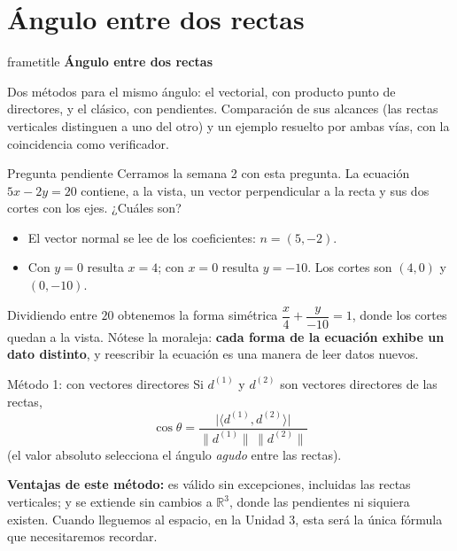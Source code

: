 \documentclass[aspectratio=169,10pt]{beamer}
\newcommand{\destaca}[1]{%
  \par\vspace{3pt}\noindent
  \colorbox{turquesaClaro}{%
    \parbox{\dimexpr\linewidth-2\fboxsep\relax}{\vspace{3pt}#1\vspace{3pt}}}%
  \par\vspace{3pt}}
\newcommand{\hojaSesion}[2]{%
  \vfill
  \begin{beamercolorbox}[wd=\textwidth,sep=16pt,center]{frametitle}
    {\Large\bfseries #1}\\[11pt]
    \begin{minipage}{0.82\textwidth}\centering\small #2\end{minipage}
  \end{beamercolorbox}
  \vfill}
\newcommand{\R}{\mathbb{R}}
\newcommand{\pp}[2]{\langle #1,#2\rangle}
\newcommand{\norma}[1]{\lVert #1\rVert}
\begin{document}
\section{Ángulo entre dos rectas}
\begin{frame}[plain]
  \hojaSesion{Ángulo entre dos rectas}{%
  Dos métodos para el mismo ángulo: el vectorial, con producto punto
  de directores, y el clásico, con pendientes. Comparación de sus
  alcances (las rectas verticales distinguen a uno del otro) y un
  ejemplo resuelto por ambas vías, con la coincidencia como
  verificador.}
\end{frame}
\begin{frame}{Pregunta pendiente}
  Cerramos la semana 2 con esta pregunta. La ecuación $5x-2y=20$
  contiene, a la vista, un vector perpendicular a la recta y sus dos
  cortes con los ejes. ¿Cuáles son?

  \vspace{0.3cm}
  \begin{itemize}
    \item El vector normal se lee de los coeficientes: $n=(5,-2)$.
    \item Con $y=0$ resulta $x=4$; con $x=0$ resulta $y=-10$.
      Los cortes son $(4,0)$ y $(0,-10)$.
  \end{itemize}

  \vspace{0.3cm}
  \destaca{Dividiendo entre $20$ obtenemos la forma simétrica
  $\dfrac{x}{4}+\dfrac{y}{-10}=1$, donde los cortes quedan a la vista.
  Nótese la moraleja: \textbf{cada forma de la ecuación exhibe un dato
  distinto}, y reescribir la ecuación es una manera de leer datos
  nuevos.}
\end{frame}
\begin{frame}{Método 1: con vectores directores}
  Si $d^{(1)}$ y $d^{(2)}$ son vectores directores de las rectas,
  \[
    \cos\theta=\frac{\bigl|\pp{d^{(1)}}{d^{(2)}}\bigr|}
      {\norma{d^{(1)}}\,\norma{d^{(2)}}}
  \]
  (el valor absoluto selecciona el ángulo \textit{agudo} entre las
  rectas).

  \vspace{0.4cm}
  \destaca{\textbf{Ventajas de este método:} es válido sin
  excepciones, incluidas las rectas verticales; y se extiende sin
  cambios a $\R^3$, donde las pendientes ni siquiera existen. Cuando
  lleguemos al espacio, en la Unidad 3, esta será la única fórmula
  que necesitaremos recordar.}
\end{frame}
\end{document}

